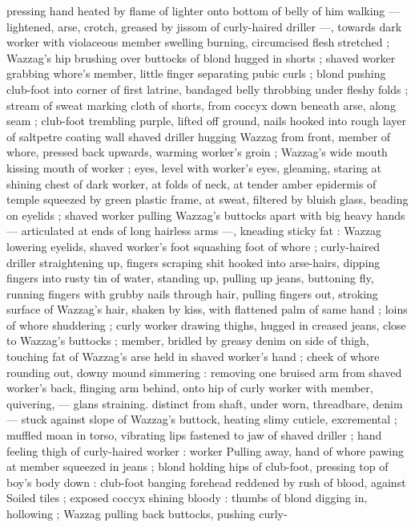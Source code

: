 pressing hand heated by flame of lighter onto bottom of belly of him 
walking --- lightened, arse, crotch, greased by jissom of curly-haired 
driller ---, towards dark worker with violaceous member swelling 
burning, circumcised flesh stretched ; Wazzag's hip brushing over 
buttocks of blond hugged in shorts ; shaved worker grabbing 
whore's member, little finger separating pubic curls ; blond pushing 
club-foot into corner of first latrine, bandaged belly throbbing under 
fleshy folds ; stream of sweat marking cloth of shorts, from coccyx 
down beneath arse, along seam ; club-foot trembling purple, lifted 
off ground, nails hooked into rough layer of saltpetre coating wall 
shaved driller hugging Wazzag from front, member of whore, 
pressed back upwards, warming worker's groin ; Wazzag's wide 
mouth kissing mouth of worker ; eyes, level with worker's eyes, 
gleaming, staring at shining chest of dark worker, at folds of neck, at 
tender amber epidermis of temple squeezed by green plastic frame, 
at sweat, filtered by bluish glass, beading on eyelids ; shaved worker 
pulling Wazzag's buttocks apart with big heavy hands --- articulated 
at ends of long hairless arms ---, kneading sticky fat : Wazzag 
lowering eyelids, shaved worker's foot squashing foot of whore ; 
curly-haired driller straightening up, fingers scraping shit hooked 
into arse-hairs, dipping fingers into rusty tin of water, standing up, 
pulling up jeans, buttoning fly, running fingers with grubby nails 
through hair, pulling fingers out, stroking surface of Wazzag's hair, 
shaken by kiss, with flattened palm of same hand ; loins of whore 
shuddering ; curly worker drawing thighs, hugged in creased jeans, 
close to Wazzag's buttocks ; member, bridled by greasy denim on 
side of thigh, touching fat of Wazzag's arse held in shaved worker's 
hand ; cheek of whore rounding out, downy mound simmering : 
removing one bruised arm from shaved worker's back, flinging arm 
behind, onto hip of curly worker with member, quivering, --- glans 
straining. distinct from shaft, under worn, threadbare, denim --- 
stuck against slope of Wazzag's buttock, heating slimy cuticle, 
excremental ; muffled moan in torso, vibrating lips fastened to jaw of 
shaved driller ; hand feeling thigh of curly-haired worker : worker 
Pulling away, hand of whore pawing at member squeezed in jeans ; 
blond holding hips of club-foot, pressing top of boy's body down : 
club-foot banging forehead reddened by rush of blood, against 
Soiled tiles ; exposed coccyx shining bloody : thumbs of blond 
digging in, hollowing ; Wazzag pulling back buttocks, pushing curly- 
